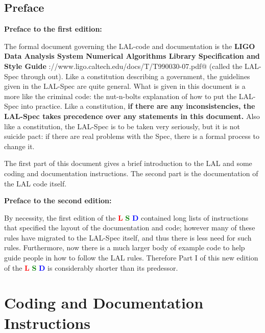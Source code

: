 \documentclass[oneside]{book}
\begin{document}
\tableofcontents


\chapter{Preface}

\bigskip
{\bf {\Huge{Preface to the first edition:}}}

\medskip
\noindent
The formal document governing the LAL-code and documentation is the
{\bf LIGO Data Analysis System Numerical Algorithms Library
Specification and Style Guide}
\verb@http://www.ligo.caltech.edu/docs/T/T990030-07.pdf@ (called the
LAL-Spec through out).  Like a constitution describing a government,
the guidelines given in the LAL-Spec are quite general. What is given
in this document  is a more like the criminal code: the nut-n-bolts
explanation of how to put the LAL-Spec into practice.  Like a
constitution, {\bf if there are any inconsistencies,  the LAL-Spec
takes precedence over any statements in this document.} Also like a
constitution, the LAL-Spec is to be taken very seriously, but it is
not suicide pact: if there are real problems with the Spec, there is a
formal process to change it.

The first part of this document gives a brief introduction to the LAL
and some coding and documentation instructions.  The second part is
the documentation of the LAL code itself.

\bigskip

\bigskip
\noindent
{\bf {\Huge{Preface to the second edition:}}}

\medskip
\noindent
By necessity, the first edition of the
{{\textcolor{red}{\bf L}} {\textcolor{green}{\bf S}} {\textcolor{blue}{\bf D}} }
contained long lists of instructions that specified the layout
of the documentation and code; however many of these rules have
migrated to the LAL-Spec itself, and thus there is less need for
such rules.  Furthermore, now there is a much
larger body of example code  to help guide people in how to
follow the LAL rules.  Therefore Part I of this new edition of
the 
{{\textcolor{red}{\bf L}} {\textcolor{green}{\bf S}} {\textcolor{blue}{\bf D}} }
is considerably shorter than its predessor.


\mainmatter

\part{Coding and Documentation Instructions}
\end{document}
